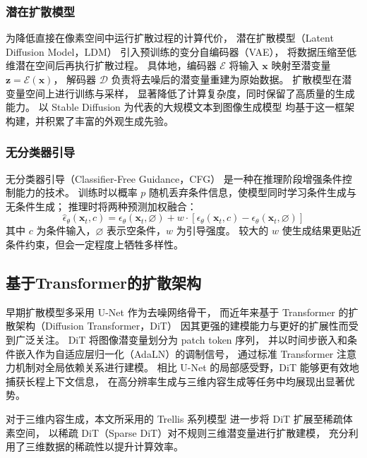 \subsubsection{潜在扩散模型}

为降低直接在像素空间中运行扩散过程的计算代价，
潜在扩散模型（Latent Diffusion Model，LDM）\cite{rombach2022high}
引入预训练的变分自编码器（VAE），
将数据压缩至低维潜在空间后再执行扩散过程。
具体地，编码器 $\mathcal{E}$ 将输入 $\mathbf{x}$ 映射至潜变量 $\mathbf{z} = \mathcal{E}(\mathbf{x})$，
解码器 $\mathcal{D}$ 负责将去噪后的潜变量重建为原始数据。
扩散模型在潜变量空间上进行训练与采样，
显著降低了计算复杂度，同时保留了高质量的生成能力。
以 Stable Diffusion\cite{rombach2022high} 为代表的大规模文本到图像生成模型
均基于这一框架构建，并积累了丰富的外观生成先验。

\subsubsection{无分类器引导}

无分类器引导（Classifier-Free Guidance，CFG）\cite{ho2022classifier}
是一种在推理阶段增强条件控制能力的技术。
训练时以概率 $p$ 随机丢弃条件信息，使模型同时学习条件生成与无条件生成；
推理时将两种预测加权融合：
\begin{equation}
    \hat{\epsilon}_\theta(\mathbf{x}_t, c) = 
    \epsilon_\theta(\mathbf{x}_t, \varnothing) + 
    w \cdot \left[\epsilon_\theta(\mathbf{x}_t, c) - \epsilon_\theta(\mathbf{x}_t, \varnothing)\right]
\end{equation}
其中 $c$ 为条件输入，$\varnothing$ 表示空条件，$w$ 为引导强度。
较大的 $w$ 使生成结果更贴近条件约束，但会一定程度上牺牲多样性。

\subsection{基于Transformer的扩散架构}

早期扩散模型多采用 U-Net 作为去噪网络骨干，
而近年来基于 Transformer 的扩散架构（Diffusion Transformer，DiT）\cite{peebles2023scalable}
因其更强的建模能力与更好的扩展性而受到广泛关注。
DiT 将图像潜变量划分为 patch token 序列，
并以时间步嵌入和条件嵌入作为自适应层归一化（AdaLN）的调制信号，
通过标准 Transformer 注意力机制对全局依赖关系进行建模。
相比 U-Net 的局部感受野，DiT 能够更有效地捕获长程上下文信息，
在高分辨率生成与三维内容生成等任务中均展现出显著优势。

对于三维内容生成，本文所采用的 Trellis 系列模型\cite{xiang2025native}
进一步将 DiT 扩展至稀疏体素空间，
以稀疏 DiT（Sparse DiT）对不规则三维潜变量进行扩散建模，
充分利用了三维数据的稀疏性以提升计算效率。


